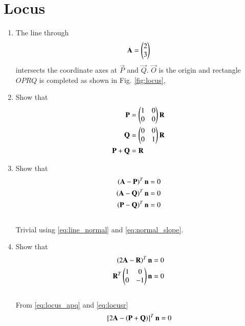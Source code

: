 \documentclass[journal,12pt,twocolumn]{IEEEtran}
\renewcommand\thesection{\arabic{section}}
\begin{document}
\section{Locus}
\begin{enumerate}[label=\thesection.\arabic*
,ref=\thesection.\theenumi]
\item The line through
\begin{equation}
\label{eq:locus}
\mathbf{A}=\begin{pmatrix}2\\3\end{pmatrix}
\end{equation}
intersects the coordinate axes at $\vec{P}$ and $\vec{Q}$.  $\vec{O}$ is the origin and rectangle $OPRQ$ is 
completed as shown in Fig. \eqref{fig:locus},
\item Show that
\begin{align}
\mathbf{P}&= \begin{pmatrix}1 & 0\\ 0 & 0\end{pmatrix}\mathbf{R}
\label{eq:locusp}
\\
\mathbf{Q}&= \begin{pmatrix}0 & 0\\ 0 & 1\end{pmatrix}\mathbf{R}
\label{eq:locusq}
\\
\mathbf{P}+\mathbf{Q} &=\mathbf{R}
\label{eq:locusr}
\end{align}
\item Show that
\begin{align}
\begin{split}
\left(\mathbf{A}-\mathbf{P}\right)^T\mathbf{n} &= 0
\\
\left(\mathbf{A}-\mathbf{Q}\right)^T\mathbf{n} &= 0
\\
\left(\mathbf{P}-\mathbf{Q}\right)^T\mathbf{n} &= 0
\end{split}
\label{eq:locus_apq}
\end{align}
\\
\solution 
Trivial using \eqref{eq:line_normal} and \eqref{eq:normal_slope}.
%
\item Show that
\begin{align}
\left(2\mathbf{A}-\mathbf{R}\right)^T\mathbf{n} &= 0
\label{eq:locusm1}
\\
\label{eq:locusm2}
\mathbf{R}^T\begin{pmatrix}1 & 0\\ 0 & -1\end{pmatrix}\mathbf{n} &= 0
\end{align}
\\
\solution
From \eqref{eq:locus_apq} and \eqref{eq:locusr}
\begin{align}
{}\left[2\mathbf{A}-\left(\mathbf{P}+\mathbf{Q}\right)\right]^T\mathbf{n} = 0
\end{align}

\end{enumerate}
\end{document}
